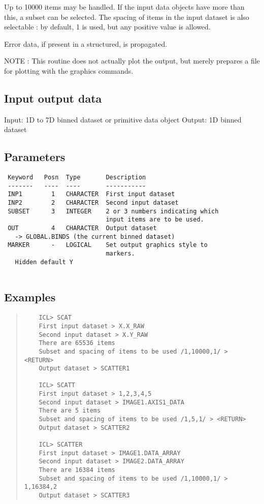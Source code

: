 \documentclass{book}
\renewcommand{\_}{{\tt\char'137}}     %
\begin{document}
Up to 10000 items may be handled. If the input data objects
have more than this, a subset can be selected. The spacing
of items in the input dataset is also selectable : by
default, 1 is used, but any positive value is allowed.
 
Error data, if present in a structured, is propagated.
 
NOTE : This routine does not actually plot the output,
but merely prepares a file for plotting with the
graphics commands.
\subsection{Input output data}
Input: 1D to 7D binned dataset or primitive data object
Output: 1D binned dataset
\subsection{Parameters}
\begin{verbatim}
 Keyword   Posn  Type       Description
 -------   ----  ----       -----------
 INP1        1   CHARACTER  First input dataset
 INP2        2   CHARACTER  Second input dataset
 SUBSET      3   INTEGER    2 or 3 numbers indicating which
                            input items are to be used.
 OUT         4   CHARACTER  Output dataset
   -> GLOBAL.BINDS (the current binned dataset)
 MARKER      -   LOGICAL    Set output graphics style to
                            markers.
   Hidden default Y
 
\end{verbatim}\subsection{Examples}
\begin{quote}\begin{verbatim}
    ICL> SCAT
    First input dataset > X.X_RAW
    Second input dataset > X.Y_RAW
    There are 65536 items
    Subset and spacing of items to be used /1,10000,1/ > <RETURN>
    Output dataset > SCATTER1
 
    ICL> SCATT
    First input dataset > 1,2,3,4,5
    Second input dataset > IMAGE1.AXIS1_DATA
    There are 5 items
    Subset and spacing of items to be used /1,5,1/ > <RETURN>
    Output dataset > SCATTER2
 
    ICL> SCATTER
    First input dataset > IMAGE1.DATA_ARRAY
    Second input dataset > IMAGE2.DATA_ARRAY
    There are 16384 items
    Subset and spacing of items to be used /1,10000,1/ > 1,16384,2
    Output dataset > SCATTER3
\end{verbatim}\end{quote}
\end{document}

